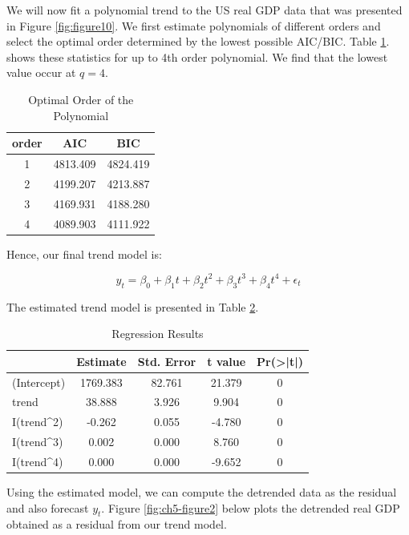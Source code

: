 \documentclass[]{book}
\theoremstyle{definition}
\theoremstyle{definition}
\theoremstyle{definition}
\theoremstyle{remark}
\begin{document}
We will now fit a polynomial trend to the US real GDP data that was presented in Figure \ref{fig:figure10}. We first estimate polynomials of different orders and select the optimal order determined by the lowest possible AIC/BIC. Table \ref{tab:ch5-table1}. shows these statistics for up to 4th order polynomial. We find that the lowest value occur at \(q=4\).

\begin{table}[t]

\caption{\label{tab:ch5-table1}Optimal Order of the Polynomial}
\centering
\begin{tabular}{ccc}
\toprule
order & AIC & BIC\\
\midrule
1 & 4813.409 & 4824.419\\
2 & 4199.207 & 4213.887\\
3 & 4169.931 & 4188.280\\
4 & 4089.903 & 4111.922\\
\bottomrule
\end{tabular}
\end{table}

Hence, our final trend model is:

\begin{equation}
y_t=\beta_0 +\beta_1 t + \beta_2 t^2 + \beta_3 t^3 + \beta_4 t^4 +\epsilon_t
\end{equation}

The estimated trend model is presented in Table \ref{tab:ch5-table2}.

\begin{table}[t]

\caption{\label{tab:ch5-table2}Regression Results}
\centering
\begin{tabular}{lcccc}
\toprule
  & Estimate & Std. Error & t value & Pr(>|t|)\\
\midrule
(Intercept) & 1769.383 & 82.761 & 21.379 & 0\\
trend & 38.888 & 3.926 & 9.904 & 0\\
I(trend\textasciicircum{}2) & -0.262 & 0.055 & -4.780 & 0\\
I(trend\textasciicircum{}3) & 0.002 & 0.000 & 8.760 & 0\\
I(trend\textasciicircum{}4) & 0.000 & 0.000 & -9.652 & 0\\
\bottomrule
\end{tabular}
\end{table}

Using the estimated model, we can compute the detrended data as the residual and also forecast \(y_t\). Figure \ref{fig:ch5-figure2} below plots the detrended real GDP obtained as a residual from our trend model.
\end{document}
